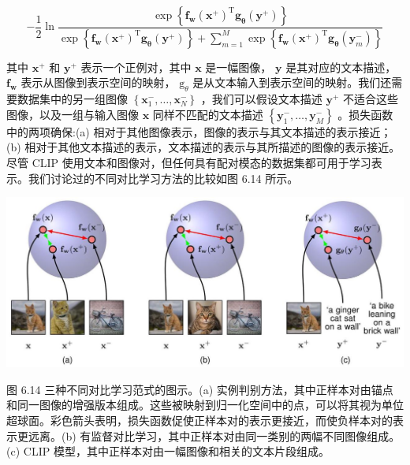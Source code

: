 \documentclass[10pt]{article}
\begin{document}
\[
- \frac{1}{2}\ln \frac{\exp \left\{  {{\mathbf{f}}_{\mathbf{w}}{\left( {\mathbf{x}}^{ + }\right) }^{\mathrm{T}}{\mathbf{g}}_{\mathbf{\theta }}\left( {\mathbf{y}}^{ + }\right) }\right\}  }{\exp \left\{  {{\mathbf{f}}_{\mathbf{w}}{\left( {\mathbf{x}}^{ + }\right) }^{\mathrm{T}}{\mathbf{g}}_{\mathbf{\theta }}\left( {\mathbf{y}}^{ + }\right) }\right\}   + \mathop{\sum }\limits_{{m = 1}}^{M}\exp \left\{  {{\mathbf{f}}_{\mathbf{w}}{\left( {\mathbf{x}}^{ + }\right) }^{\mathrm{T}}{\mathbf{g}}_{\mathbf{\theta }}\left( {\mathbf{y}}_{m}^{ - }\right) }\right\}  } \tag{6.21}
\]

其中 \({\mathbf{x}}^{ + }\) 和 \({\mathbf{y}}^{ + }\) 表示一个正例对，其中 \(\mathbf{x}\) 是一幅图像， \(\mathbf{y}\) 是其对应的文本描述， \({\mathbf{f}}_{\mathbf{w}}\) 表示从图像到表示空间的映射， \({\mathrm{g}}_{\theta }\) 是从文本输入到表示空间的映射。我们还需要数据集中的另一组图像 \(\left\{  {{\mathbf{x}}_{1}^{ - },\ldots ,{\mathbf{x}}_{N}^{ - }}\right\}\) ，我们可以假设文本描述 \({\mathbf{y}}^{ + }\) 不适合这些图像，以及一组与输入图像 \(\mathbf{x}\) 同样不匹配的文本描述 \(\left\{  {{\mathbf{y}}_{1}^{ - },\ldots ,{\mathbf{y}}_{M}^{ - }}\right\}\) 。损失函数中的两项确保:(a) 相对于其他图像表示，图像的表示与其文本描述的表示接近；(b) 相对于其他文本描述的表示，文本描述的表示与其所描述的图像的表示接近。尽管 CLIP 使用文本和图像对，但任何具有配对模态的数据集都可用于学习表示。我们讨论过的不同对比学习方法的比较如图 6.14 所示。

\begin{center}
\includegraphics[max width=1.0\textwidth]{images/0194e279-9b28-703a-88f4-c3ac21e2010d_212_239_346_1289_553_0.jpg}
\end{center}
\hspace*{3em} 

图 6.14 三种不同对比学习范式的图示。(a) 实例判别方法，其中正样本对由锚点和同一图像的增强版本组成。这些被映射到归一化空间中的点，可以将其视为单位超球面。彩色箭头表明，损失函数促使正样本对的表示更接近，而使负样本对的表示更远离。(b) 有监督对比学习，其中正样本对由同一类别的两幅不同图像组成。(c) CLIP 模型，其中正样本对由一幅图像和相关的文本片段组成。
\end{document}
